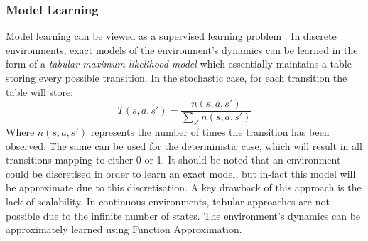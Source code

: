 \subsubsection{Model Learning}
Model learning can be viewed as a supervised learning problem \citep{JORDAN1992307}. In discrete environments, exact models of the environment's dynamics can be learned in the form of a \textit{tabular maximum likelihood model} \citep{10.1145/122344.122377} which essentially maintains a table storing every possible transition. In the stochastic case, for each transition the table will store:
\begin{equation}
\label{eqn:tmlmupdate}
T(s, a, s') = \frac{n(s, a, s')}{\sum_{s'}n(s,a,s')}
\end{equation}
Where $n(s,a,s')$ represents the number of times the transition has been observed.
The same can be used for the deterministic case, which will result in all transitions mapping to either 0 or 1. It should be noted that an environment could be discretised in order to learn an exact model, but in-fact this model will be approximate due to this discretisation.
A key drawback of this approach is the lack of scalability.
In continuous environments, tabular approaches are not possible due to the infinite number of states. The environment's dynamics can be approximately learned using Function Approximation.
